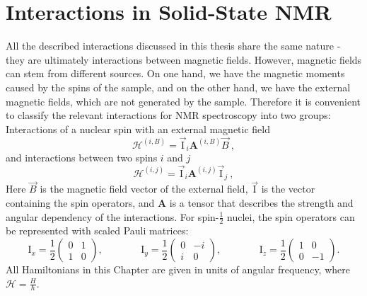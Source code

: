 \section{Interactions in Solid-State NMR}
All the described interactions discussed in this thesis share the same nature - they are ultimately interactions between magnetic fields.
However, magnetic fields can stem from different sources.
On one hand, we have the magnetic moments caused by the spins of the sample, and on the other hand, we have the external magnetic fields, which are not generated by the sample.
Therefore it is convenient to classify the relevant interactions for NMR spectroscopy into two groups: Interactions of a nuclear spin with an external magnetic field
\begin{equation}
\mathcal{{H}}^{(i,B)}={\vec{\textrm{I}}}_i\mathbf{A}^{(i,B)}\vec{B}~,
\label{eq:spin-field}
\end{equation}
and interactions between two spins $i$ and $j$
\begin{equation}
\mathcal{{H}}^{(i,j)}={\vec{\textrm{I}}}_i\mathbf{A}^{(i,j)}{\vec{\textrm{I}}}_j~,
\label{eq:spin-spin}
\end{equation}
Here $\vec{B}$ is the magnetic field vector of the external field, ${\vec{\textrm{I}}}$ is the vector containing the spin operators, and $\mathbf{A}$ is a tensor that describes the strength and angular dependency of the interactions. For spin-$\frac{1}{2}$ nuclei, the spin operators can be represented with scaled Pauli matrices:
\begin{equation}
{\textrm{I}}_x = \frac{1}{2}
\begin{pmatrix}
0 & 1 \\
1 & 0 
\end{pmatrix}
\textrm{,~~~~~~~~~~~~}{\textrm{I}}_y = \frac{1}{2}
\begin{pmatrix}
0 & -i  \\
i & 0  
\end{pmatrix}
\textrm{,~~~~~~~~~~~~}{\textrm{I}}_z = \frac{1}{2}
\begin{pmatrix}
1 & 0\\
0 & -1 
\end{pmatrix}
\textrm{.}
\label{eq:pauli}
\end{equation}
All Hamiltonians in this Chapter are given in units of angular frequency, where $\mathcal{{H}} = \frac{H}{\hbar}$.

